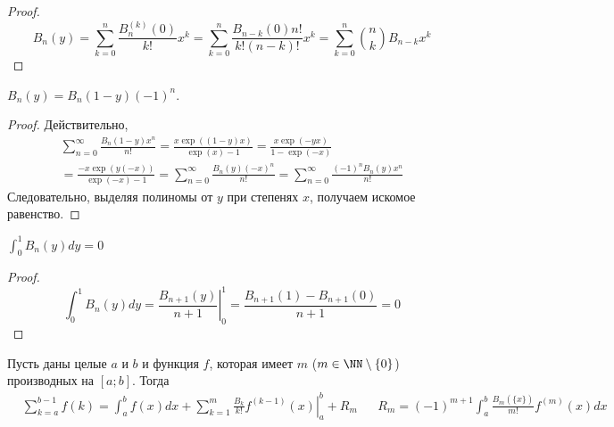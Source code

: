 \documentclass[12pt,a4paper]{article}
\begin{document}
    \begin{proof}
        \[B_n(y) = \sum_{k=0}^n \frac{B_n^{(k)}(0)}{k!} x^k = \sum_{k=0}^n \frac{B_{n-k}(0) n!}{k! (n-k)!} x^k = \sum_{k=0}^n \binom{n}{k} B_{n-k} x^k\]
    \end{proof}

    \begin{lemma}
        $B_n(y) = B_n(1-y) (-1)^n$.
    \end{lemma}

    \begin{proof}
        Действительно,
        \begin{multline*}
            \sum_{n=0}^\infty \frac{B_n(1-y) x^n}{n!}
            = \frac{x \exp((1-y)x)}{\exp(x) - 1}
            = \frac{x \exp(-yx)}{1 - \exp(-x)}\\
            = \frac{-x \exp(y(-x))}{\exp(-x) - 1}
            = \sum_{n=0}^\infty \frac{B_n(y) (-x)^n}{n!}
            = \sum_{n=0}^\infty \frac{(-1)^n B_n(y) x^n}{n!}
        \end{multline*}
        Следовательно, выделяя полиномы от $y$ при степенях $x$, получаем искомое равенство.
    \end{proof}

    \begin{corollary}
        $\int_0^1 B_n(y) dy = 0$
    \end{corollary}

    \begin{proof}
        \[\int_0^1 B_n(y) dy = \left.\frac{B_{n+1}(y)}{n+1}\right|_0^1 = \frac{B_{n+1}(1) - B_{n+1}(0)}{n+1} = 0\]
    \end{proof}

    \begin{theorem}
        Пусть даны целые $a$ и $b$ и функция $f$, которая имеет $m$ ($m \in \NN \setminus \{0\}$) производных на $[a; b]$. Тогда
        \begin{align*}
            &\sum_{k=a}^{b-1} f(k) = \int_{a}^b f(x)dx + \sum_{k=1}^m \left.\frac{B_k}{k!} f^{(k-1)}(x)\right|_a^b + R_m&
            &R_m = (-1)^{m+1} \int_a^b \frac{B_m(\{x\})}{m!} f^{(m)}(x)dx
        \end{align*}
    \end{theorem}
\end{document}
